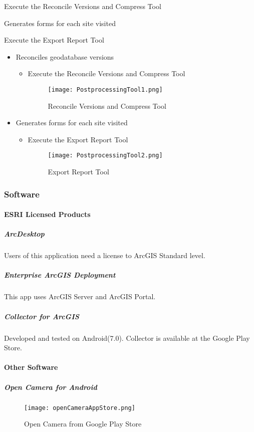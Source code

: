 \documentclass[class=book , crop=false, titlepage, twoside, multi={itemize, figure, verbatim}, float=false]{standalone}
\begin{document}
Execute the Reconcile Versions and Compress Tool
\vspace{2in}

Generates forms for each site visited
\vspace{1.25in}

Execute the Export Report Tool
\clearpage
%
%
%
\begin{itemize}
\item Reconciles geodatabase versions
\begin{itemize}
\item Execute the Reconcile Versions and Compress Tool
%
%
\begin{figure}[h!]
\centering
    \texttt{[image: PostprocessingTool1.png]}
\caption{Reconcile Versions and Compress Tool}
\end{figure}
\end{itemize}

\item Generates forms for each site visited
\begin{itemize}
\item Execute the Export Report Tool
%
%
\begin{figure}[h!]
\centering
    \texttt{[image: PostprocessingTool2.png]}
\caption{Export Report Tool}
\end{figure}
\end{itemize}
\end{itemize}
\clearpage
%
%
%
\subsubsection{Software}
\paragraph{ESRI Licensed Products}
\subparagraph{ArcDesktop}Users of this application need a license to ArcGIS Standard level.

\subparagraph{Enterprise ArcGIS Deployment}This app uses ArcGIS Server and ArcGIS Portal.

\subparagraph{Collector for ArcGIS}Developed and tested on Android(7.0).  Collector is available at the Google Play Store.

\paragraph{Other Software}

\subparagraph{Open Camera for Android}
%
%
\begin{figure}[h!]
\centering
    \texttt{[image: openCameraAppStore.png]}
\caption{Open Camera from Google Play Store}
\end{figure}
\end{document}
